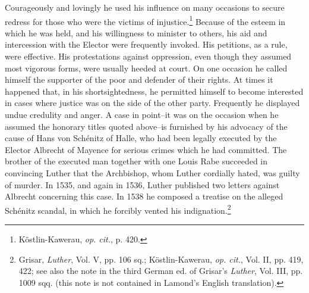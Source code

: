 Courageously and lovingly he used his influence on many occasions
to secure redress for those who were the victims of injustice.\footnote
{Köstlin-Kawerau, \textit{op. cit.}, p. 420.}
Because of the esteem in which he was held, and his willingness to
minister to others, his aid and intercession with the Elector were frequently
invoked. His petitions, as a rule, were effective. His protestations against
oppression, even though they assumed most vigorous
forms, were usually heeded at court. On one occasion he called
himself the supporter of the poor and defender of their rights. At
times it happened that, in his shortsightedness, he permitted himself
to become interested in cases where justice was on the side of the
other party. Frequently he displayed undue credulity and anger. A
case in point--it was on the occasion when he assumed the honorary
titles quoted above--is furnished by his advocacy of the cause of
Hans von Schénitz of Halle, who had been legally executed by the
Elector Albrecht of Mayence for serious crimes which he had committed.
The brother of the executed man together with one Louis
Rabe succeeded in convincing Luther that the Archbishop, whom
Luther cordially hated, was guilty of murder. In 1535, and again in
1536, Luther published two letters against Albrecht concerning this
case. In 1538 he composed a treatise on the alleged Schénitz scandal,
in which he forcibly vented his indignation.\footnote
{Grisar, \textit{Luther}, Vol. V, pp. 106 sq.; Köstlin-Kawerau, \textit{op. cit.}, Vol. II, pp. 419, 422;
see also the note in the third German ed. of Grisar’s \textit{Luther}, Vol. III, pp. 1009 sqq. (this
note is not contained in Lamond’s English translation).}

